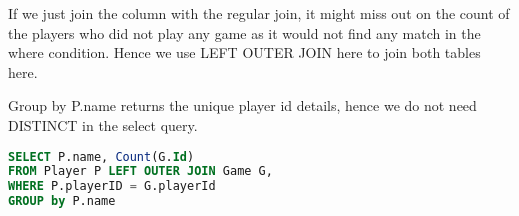 \begin{enumerate}
If we just join the column with the regular join, it might miss out on the count of the players who did not play any game as it would not find any match in the where condition.
 Hence we use LEFT OUTER JOIN here to join both tables here.

Group by P.name returns the unique player id details, hence we do not need DISTINCT in the select query.

\begin{lstlisting}[language=sql]
SELECT P.name, Count(G.Id)
FROM Player P LEFT OUTER JOIN Game G,
WHERE P.playerID = G.playerId
GROUP by P.name
\end{lstlisting}
\end{enumerate}


